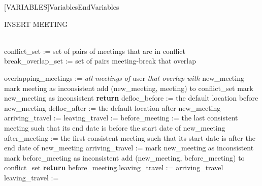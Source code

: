 [VARIABLES]{Variables}{EndVariables}
   {\algorithmicvariables}
   {\algorithmicend\ \algorithmicvariables}

\begin{algorithm}
\renewcommand\thealgorithm{}
\caption{INSERT MEETING}
\Variables \\
	conflict\_set := set of pairs of meetings that are in conflict \\
	break\_overlap\_set := set of pairs meeting-break that overlap
\State
	\begin{algorithmic}[1]
		\State overlapping\_meetings := \textit{all meetings of} user \textit{that overlap with} new\_meeting
			\State mark meeting as inconsistent
			\State add (new\_meeting, meeting) to conflict\_set
		\EndFor
			\State mark new\_meeting as inconsistent
			\State \textbf{return}
		\EndIf
		\State defloc\_before := the default location before new\_meeting
		\State defloc\_after := the default location after new\_meeting
		\State arriving\_travel := 
		\State leaving\_travel := 
		\State before\_meeting := the last consistent meeting such that its end date is before the start date of new\_meeting
		\State after\_meeting := the first consistent meeting such that its start date is after the end date of new\_meeting
		\Statex
			\State arriving\_travel := 
				\State mark new\_meeting as inconsistent
				\State mark before\_meeting as inconsistent
				\State add (new\_meeting, before\_meeting) to conflict\_set
				\State \textbf{return}	
			\Else
				\State before\_meeting.leaving\_travel := arriving\_travel			
			\EndIf
		\EndIf
		\Statex
			\State leaving\_travel := 

\end{algorithmic}
\end{algorithm}
